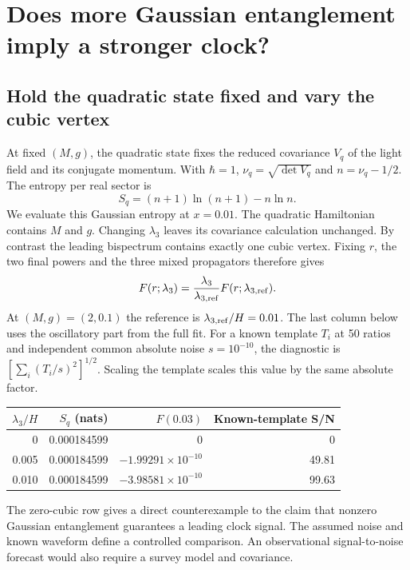 \clearpage\section{Does more Gaussian entanglement imply a stronger clock?}
\subsection{Hold the quadratic state fixed and vary the cubic vertex}
At fixed $(M,g)$, the quadratic state fixes the reduced covariance $V_q$ of the light field and its conjugate momentum. With $\hbar=1$, $\nu_q=\sqrt{\det V_q}$ and $n=\nu_q-1/2$. The entropy per real sector is
\[
 S_q=(n+1)\ln(n+1)-n\ln n .
\]
We evaluate this Gaussian entropy at $x=0.01$. The quadratic Hamiltonian contains $M$ and $g$. Changing $\lambda_3$ leaves its covariance calculation unchanged. By contrast the leading bispectrum contains exactly one cubic vertex. Fixing $r$, the two final powers and the three mixed propagators therefore gives
\[
 F(r;\lambda_3)=\frac{\lambda_3}{\lambda_{3,\rm ref}}F(r;\lambda_{3,\rm ref}) .
\]
At $(M,g)=(2,0.1)$ the reference is $\lambda_{3,\rm ref}/H=0.01$. The last column below uses the oscillatory part from the full fit. For a known template $T_i$ at 50 ratios and independent common absolute noise $s=10^{-10}$, the diagnostic is $[\sum_i(T_i/s)^2]^{1/2}$. Scaling the template scales this value by the same absolute factor.
\begin{center}\begin{tabular}{rrrr}\toprule $\lambda_3/H$ & $S_q$ (nats) & $F(0.03)$ & Known-template S/N\\\midrule
0 & 0.000184599 & 0 & 0\\
0.005 & 0.000184599 & $-1.99291\times10^{-10}$ & 49.81\\
0.010 & 0.000184599 & $-3.98581\times10^{-10}$ & 99.63\\\bottomrule\end{tabular}\end{center}
The zero-cubic row gives a direct counterexample to the claim that nonzero Gaussian entanglement guarantees a leading clock signal. The assumed noise and known waveform define a controlled comparison. An observational signal-to-noise forecast would also require a survey model and covariance.

